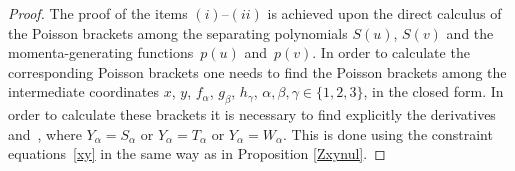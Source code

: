 \documentclass[10pt,a4paper]{amsart}
\def\a{\alpha}
\def\b{\beta}
\def\g{\gamma}
\numberwithin{equation}{section}
\begin{document}
\begin{proof}
The proof of the items $(i)$--$(ii)$ is achieved upon the direct calculus of the Poisson brackets
among the separating polynomials $S(u)$, $S(v)$ and the momenta-generating functions~$p(u)$ and~$p(v)$. In order to calculate the corresponding Poisson brackets one needs to find the
 Poisson brackets among the intermediate coordinates $x$, $y$, $f_{\a}$, $g_{\b}$, $h_{\g}$, $\a,\b,\g \in \{1,2,3\}$, in the closed form.
 In order to calculate these brackets it is necessary to find explicitly the derivatives~\smash{$\frac{\partial x}{\partial Y_{ \a}}$} and~\smash{$\frac{\partial y}{\partial Y_{ \a}}$}, where $Y_{\a}=S_{\a}$ or $Y_{\a}=T_{\a}$ or $Y_{\a}=W_{\a}$.
 This is done using the constraint equations~\eqref{xy} in the same way as in Proposition \ref{Zxynul}.


\end{proof}
\end{document}
